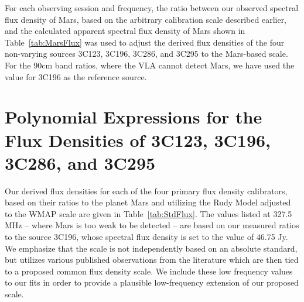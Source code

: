 \documentclass{aastex}
\begin{document}
For each observing session and frequency, the ratio between our
observed spectral flux density of Mars, based on the arbitrary
calibration scale described earlier, and the calculated apparent
spectral flux density of Mars shown in Table~\ref{tab:MarsFlux} was
used to adjust the derived flux densities of the four non-varying
sources 3C123, 3C196, 3C286, and 3C295 to the Mars-based scale.  For
the 90cm band ratios, where the VLA cannot detect Mars, we have used
the \citet{Sca12} value for 3C196 as the reference source.


\section{Polynomial Expressions for the Flux Densities of 3C123, 3C196, 3C286, and 3C295}

Our derived flux densities for each of the four primary flux density
calibrators, based on their ratios to the planet Mars and utilizing
the Rudy Model adjusted to the WMAP scale are given in
Table~\ref{tab:StdFlux}.  The values listed at 327.5 MHz -- where Mars
is too weak to be detected -- are based on our measured ratios to the
source 3C196, whose spectral flux density is set to the
\citet{Sca12}value of 46.75 Jy.  We emphasize that the \citet{Sca12}
scale is not independently based on an absolute standard, but utilizes
various published observations from the literature which are then tied
to a proposed common flux density scale.  We include these low
frequency values to our fits in order to provide a plausible
low-frequency extension of our proposed scale.
\end{document}
